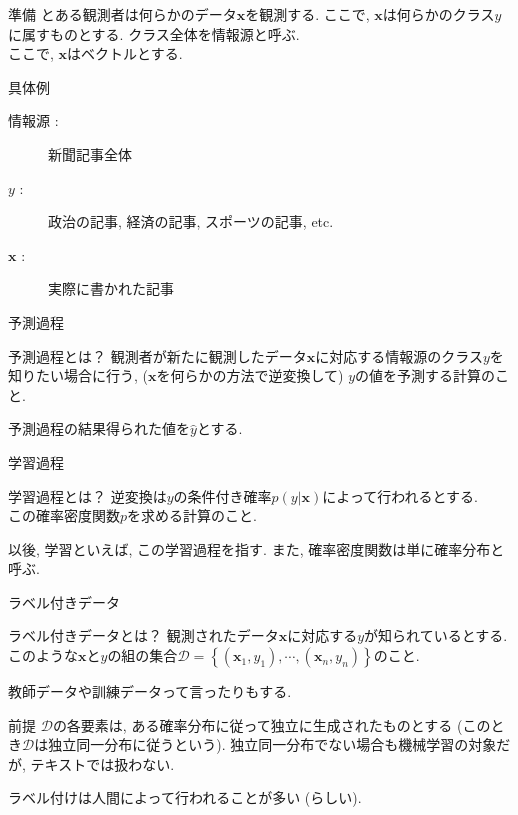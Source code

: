 \documentclass[aspectratio=43, dvipdfmx, 12pt]{beamer}
\newcommand{\vek}[1]{\bm{#1}} %
\begin{document}
\begin{frame}{準備}
  とある観測者は何らかのデータ$\vek{x}$を観測する. ここで, $\vek{x}$は何らかのクラス$y$に属すものとする. クラス全体を\alert{情報源}と呼ぶ. \\
  ここで, $\vek{x}$はベクトルとする. 
  \begin{exampleblock}{具体例}
    \begin{description}
      \item[情報源 :] 新聞記事全体
      \item[$y$ :] 政治の記事, 経済の記事, スポーツの記事, etc. 
      \item[$\vek{x}$ :] 実際に書かれた記事
    \end{description}
  \end{exampleblock}
\end{frame}

\begin{frame}{予測過程}
  \begin{block}{予測過程とは？}
  観測者が新たに観測したデータ$\vek{x}$に対応する情報源のクラス$y$を知りたい場合に行う,
  ($\vek{x}$を何らかの方法で逆変換して) $y$の値を予測する計算のこと.
  \end{block}

  予測過程の結果得られた値を$\hat{y}$とする.
\end{frame}

\begin{frame}{学習過程}
  \begin{block}{学習過程とは？}
    逆変換は$y$の条件付き確率$p(y|\vek{x})$によって行われるとする. \\
    この確率密度関数$p$を求める計算のこと.
  \end{block}
  以後, 学習といえば, この学習過程を指す. また, 確率密度関数は単に確率分布と呼ぶ. 
\end{frame}

\begin{frame}{ラベル付きデータ}
  \begin{block}{ラベル付きデータとは？}
    観測されたデータ$\vek{x}$に対応する$y$が知られているとする. \\
    このような$\vek{x}$と$y$の組の集合$\mathcal{D}=\left\{(\vek{x}_{1}, y_{1}), \cdots, (\vek{x}_{n}, y_{n})\right\}$のこと.
  \end{block}
  教師データや訓練データって言ったりもする.
  \begin{alertblock}{前提}
    $\mathcal{D}$の各要素は, ある確率分布に従って独立に生成されたものとする (このとき$\mathcal{D}$は\alert{独立同一分布}に従うという).
    独立同一分布でない場合も機械学習の対象だが, テキストでは扱わない.
  \end{alertblock}
  ラベル付けは人間によって行われることが多い (らしい).
\end{frame}
\end{document}

